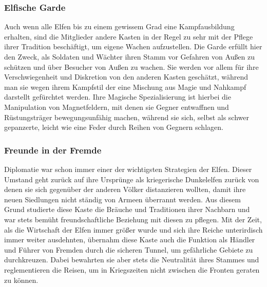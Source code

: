 \documentclass[a4paper,12pt,oneside]{book}
\begin{document}
\subsubsection{Elfische Garde}
Auch wenn alle Elfen bis zu einem gewissem Grad eine Kampfausbildung erhalten, sind die Mitglieder andere Kasten in der Regel zu sehr mit der Pflege ihrer Tradition beschäftigt, um eigene Wachen aufzustellen. Die Garde erfüllt hier den Zweck, als Soldaten und Wächter ihren Stamm vor Gefahren von Außen zu schützen und über Besucher von Außen zu wachen. Sie werden vor allem für ihre Verschwiegenheit und Diskretion von den anderen Kasten geschätzt, während man sie wegen ihrem Kampfstil der eine Mischung aus Magie und Nahkampf darstellt gefürchtet werden. Ihre Magische Spezialisierung ist hierbei die Manipulation von Magnetfeldern, mit denen sie Gegner entwaffnen und Rüstungsträger bewegungsunfähig machen, während sie sich, selbst als schwer gepanzerte, leicht wie eine Feder durch Reihen von Gegnern schlagen. 

\subsubsection{Freunde in der Fremde}
Diplomatie war schon immer einer der wichtigsten Strategien der Elfen. Dieser Umstand geht zurück auf ihre Ursprünge als kriegerische Dunkelelfen zurück von denen sie sich gegenüber der anderen Völker distanzieren wollten, damit ihre neuen Siedlungen nicht ständig von Armeen überrannt werden. Aus diesem Grund studierte diese Kaste die Bräuche und Traditionen ihrer Nachbarn und war stets bemüht freundschaftliche Beziehung mit diesen zu pflegen. Mit der Zeit, als die Wirtschaft der Elfen immer größer wurde und sich ihre Reiche unterirdisch immer weiter ausdehnten, übernahm diese Kaste auch die Funktion als Händler und Führer von Fremden durch die sicheren Tunnel, um gefährliche Gebiete zu durchkreuzen. Dabei bewahrten sie aber stets die Neutralität ihres Stammes und reglementieren die Reisen, um in Kriegszeiten nicht zwischen die Fronten geraten zu können.
\end{document}

